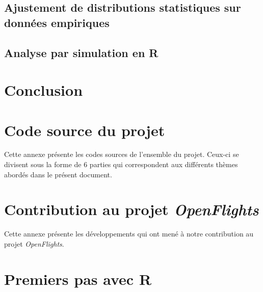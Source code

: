 \documentclass{report}
\begin{document}
\section{Ajustement de distributions statistiques sur données empiriques}
	\label{sec:fitDist}
	

\section{Analyse par simulation en R}
	\label{sec:simul}
	
	
\chapter*{Conclusion}
	




\appendix
\chapter{Code source du projet}
	\label{ann:srcProject}
	Cette annexe présente les codes sources de l'ensemble du projet. Ceux-ci se divisent sous la forme de 6 parties qui correspondent aux différents thèmes abordés dans le présent document. \\








\chapter{Contribution au projet \emph{OpenFlights}}
	\label{ann:contribOpenFlights}
Cette annexe présente les développements qui ont mené à notre contribution au projet \emph{OpenFlights}. \\

	


	
\chapter{Premiers pas avec R}
	\label{ann:gettingStarted}
	
\end{document}
